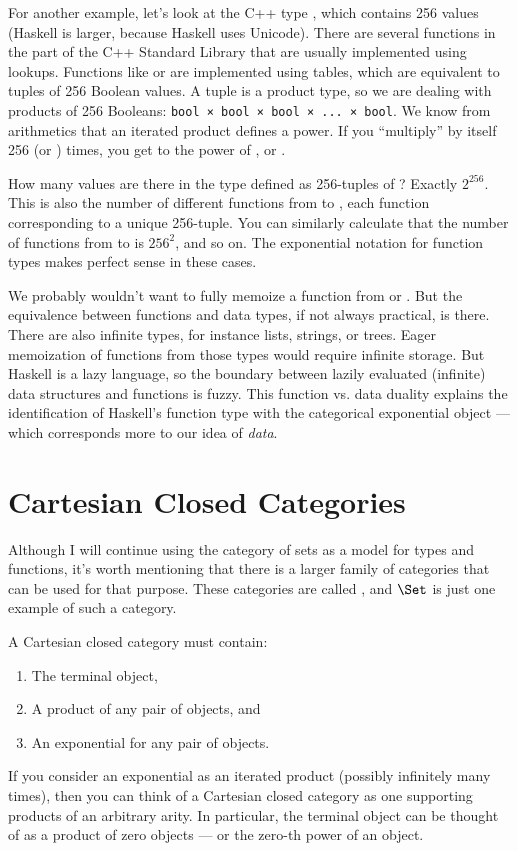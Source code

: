 For another example, let's look at the C++ type , which
contains 256 values (Haskell  is larger, because Haskell
uses Unicode). There are several functions in the part of the
C++ Standard Library that are usually implemented using lookups.
Functions like  or  are implemented
using tables, which are equivalent to tuples of 256 Boolean values. A
tuple is a product type, so we are dealing with products of 256
Booleans: {\small\texttt{bool × bool × bool × ... × bool}}. We know from
arithmetics that an iterated product defines a power. If you
``multiply''  by itself 256 (or ) times, you
get  to the power of , or \textsuperscript{}.

How many values are there in the type defined as 256-tuples of
? Exactly $2^{256}$. This is also the number
of different functions from  to , each
function corresponding to a unique 256-tuple. You can similarly
calculate that the number of functions from  to
 is $256^{2}$, and so on. The exponential
notation for function types makes perfect sense in these cases.

We probably wouldn't want to fully memoize a function from 
or . But the equivalence between functions and data
types, if not always practical, is there. There are also infinite types,
for instance lists, strings, or trees. Eager memoization of functions
from those types would require infinite storage. But Haskell is a lazy
language, so the boundary between lazily evaluated (infinite) data
structures and functions is fuzzy. This function vs. data duality
explains the identification of Haskell's function type with the
categorical exponential object --- which corresponds more to our idea of
\emph{data}.

\section{Cartesian Closed Categories}

Although I will continue using the category of sets as a model for types
and functions, it's worth mentioning that there is a larger family of
categories that can be used for that purpose. These categories are
called , and $\Set$ is just one example of
such a category.

A Cartesian closed category must contain:

\begin{enumerate}
\tightlist
\item
  The terminal object,
\item
  A product of any pair of objects, and
\item
  An exponential for any pair of objects.
\end{enumerate}
If you consider an exponential as an iterated product (possibly
infinitely many times), then you can think of a Cartesian closed
category as one supporting products of an arbitrary arity. In
particular, the terminal object can be thought of as a product of zero
objects --- or the zero-th power of an object.

